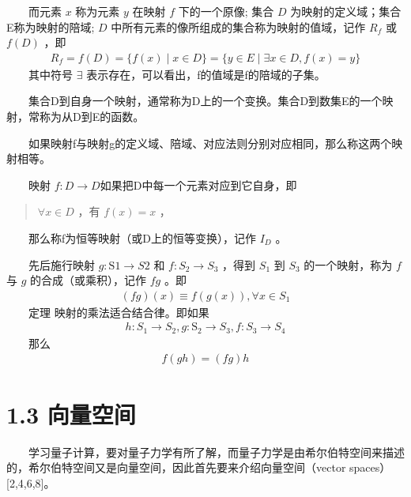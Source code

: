 \documentclass[a4paper,11pt,english]{sphinxmanual}
\begin{document}
\sphinxAtStartPar
​  而元素 \(x\) 称为元素 \(y\) 在映射 \(f\) 下的一个原像; 集合 \(D\) 为映射的定义域；集合E称为映射的陪域;  \(D\) 中所有元素的像所组成的集合称为映射的值域，记作  \(R_{f}\) 或  \(f(D)\) ，即
\begin{equation*}
\begin{split}R_{f}=f(D)=\{f(x) \mid x \in D\}=\{y \in E \mid \exists x \in D, f(x)=y\}\end{split}
\end{equation*}
\sphinxAtStartPar
​  其中符号 \(\exists\) 表示存在，可以看出，f的值域是f的陪域的子集。

\sphinxAtStartPar
​  集合D到自身一个映射，通常称为D上的一个变换。集合D到数集E的一个映射，常称为从D到E的函数。

\sphinxAtStartPar
​  如果映射f与映射g的定义域、陪域、对应法则分别对应相同，那么称这两个映射相等。

\sphinxAtStartPar
​  映射 \(f: D \rightarrow D\) ​如果把D中每一个元素对应到它自身，即
\begin{quote}

\sphinxAtStartPar
\(\forall x \in D\) ，有 \(f(x)=x\) ，
\end{quote}

\sphinxAtStartPar
​  那么称f为恒等映射（或D上的恒等变换），记作 \(I_{D}\) 。

\sphinxAtStartPar
​  先后施行映射 \(g: \mathrm{S}{1} \rightarrow S{2}\) 和 \(f: S_{2} \rightarrow S_{3}\) ，得到 \(S_{1}\) 到 \(S_{3}\) 的一个映射，称为 \(f\) 与 \(g\) 的合成（或乘积），记作 \(fg\) 。即
\begin{equation*}
\begin{split}(f g)(x) \equiv f(g(x)), \forall x \in S_{1}\end{split}
\end{equation*}
\sphinxAtStartPar
​  定理 映射的乘法适合结合律。即如果
\begin{equation*}
\begin{split}h: S_{1} \rightarrow S_{2}, g: \mathrm{S}_{2} \rightarrow S_{3}, f: S_{3} \rightarrow S_{4}\end{split}
\end{equation*}
\sphinxAtStartPar
​  那么
\begin{equation*}
\begin{split}f(g h)=(f g) h\end{split}
\end{equation*}
\sphinxstepscope


\section{1.3 向量空间}
\label{\detokenize{rst/_u9644_u5f551_u91cf_u5b50_u8ba1_u7b97_u6570_u5b66_u57fa_u78402:id1}}\label{\detokenize{rst/_u9644_u5f551_u91cf_u5b50_u8ba1_u7b97_u6570_u5b66_u57fa_u78402::doc}}
\sphinxAtStartPar
​  学习量子计算，要对量子力学有所了解，而量子力学是由希尔伯特空间来描述的，希尔伯特空间又是向量空间，因此首先要来介绍向量空间（vector spaces）{[}2,4,6,8{]}。
\end{document}
